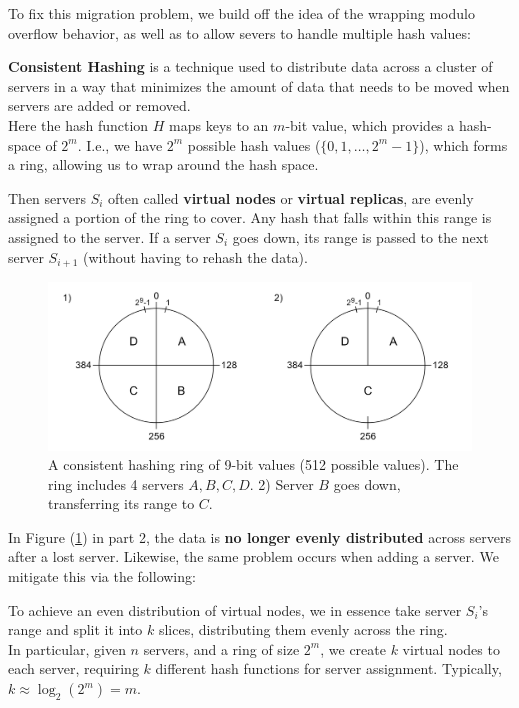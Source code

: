 \newpage 
\noindent
To fix this migration problem, we build off the idea of the wrapping modulo overflow behavior, as well as to allow severs to handle multiple hash values:
\begin{Def}

    \textbf{Consistent Hashing} is a technique used to distribute data across a cluster of servers in a way that minimizes the amount of data that needs to be moved when servers are added or removed.\\

    \noindent
    Here the hash function $H$ maps keys to an $m$-bit value, which provides a hash-space of $2^m$. I.e.,
    we have $2^m$ possible hash values ($\{0,1,\ldots,2^m-1\}$), which forms a ring, allowing us to wrap around the hash space.

    Then servers $S_i$ often called \textbf{virtual nodes} or \textbf{virtual replicas}, are evenly assigned a portion of the ring to cover. Any hash that falls within this range is assigned to the server.
    If a server $S_i$ goes down, its range is passed to the next server $S_{i+1}$ (without having to rehash the data).
\end{Def}

\begin{figure}[h]
        
            \centering
            \includegraphics[width=\textwidth]{Sections/shard/ring.png}
            \caption{A consistent hashing ring of 9-bit values (512 possible values). The ring includes 4 servers $A,B,C,D$. 2) Server $B$ goes down, transferring its range to $C$.}
            \label{fig:ring}
\end{figure}

\noindent 
In Figure (\ref{fig:ring}) in part 2, the data is \textbf{no longer evenly distributed} across servers after a lost server. Likewise, the 
same problem occurs when adding a server. We mitigate this via the following:

\begin{Def}
    \noindent
    To achieve an even distribution of virtual nodes, we in essence take server $S_i$'s range and split it into $k$ slices, distributing them evenly across the ring.\\

    \noindent
    In particular, given $n$ servers, and a ring of size $2^m$, we create $k$ virtual nodes to each server, requiring $k$ different hash functions for server assignment.
    Typically, $k\approx \log_2(2^m)=m$. \hfill \cite{RoughgardenValiant2024CS168L1}
\end{Def}

